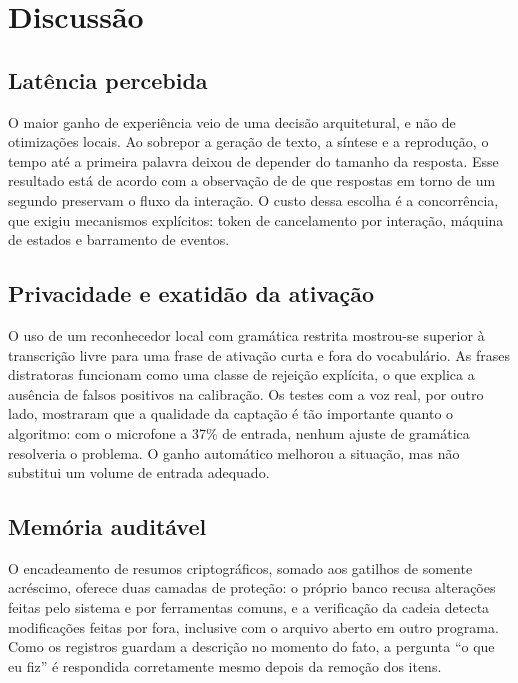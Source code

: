 \section{Discussão}

\subsection{Latência percebida}

O maior ganho de experiência veio de uma decisão arquitetural, e não de otimizações locais. Ao
sobrepor a geração de texto, a síntese e a reprodução, o tempo até a primeira palavra deixou de
depender do tamanho da resposta. Esse resultado está de acordo com a observação de
\textcite{nielsen1993} de que respostas em torno de um segundo preservam o fluxo da interação. O custo
dessa escolha é a concorrência, que exigiu mecanismos explícitos: token de cancelamento por interação,
máquina de estados e barramento de eventos.

\subsection{Privacidade e exatidão da ativação}

O uso de um reconhecedor local com gramática restrita mostrou-se superior à transcrição livre para uma
frase de ativação curta e fora do vocabulário. As frases distratoras funcionam como uma classe de
rejeição explícita, o que explica a ausência de falsos positivos na calibração. Os testes com a voz
real, por outro lado, mostraram que a qualidade da captação é tão importante quanto o algoritmo: com o
microfone a 37\% de entrada, nenhum ajuste de gramática resolveria o problema. O ganho automático
melhorou a situação, mas não substitui um volume de entrada adequado.

\subsection{Memória auditável}

O encadeamento de resumos criptográficos, somado aos gatilhos de somente acréscimo, oferece duas
camadas de proteção: o próprio banco recusa alterações feitas pelo sistema e por ferramentas comuns, e a
verificação da cadeia detecta modificações feitas por fora, inclusive com o arquivo aberto em outro
programa. Como os registros guardam a descrição no momento do fato, a pergunta “o que eu fiz” é
respondida corretamente mesmo depois da remoção dos itens.

